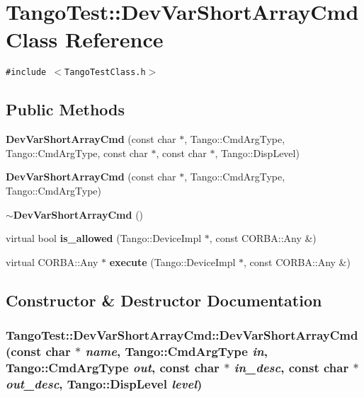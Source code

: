 \section{Tango\-Test::Dev\-Var\-Short\-Array\-Cmd  Class Reference}
\label{classTangoTest_1_1DevVarShortArrayCmd}
{\tt \#include $<$Tango\-Test\-Class.h$>$}

\subsection*{Public Methods}
\begin{CompactItemize}
\item 
{\bf Dev\-Var\-Short\-Array\-Cmd} (const char $\ast$, Tango::Cmd\-Arg\-Type, Tango::Cmd\-Arg\-Type, const char $\ast$, const char $\ast$, Tango::Disp\-Level)
\item 
{\bf Dev\-Var\-Short\-Array\-Cmd} (const char $\ast$, Tango::Cmd\-Arg\-Type, Tango::Cmd\-Arg\-Type)
\item 
{\bf $\sim$Dev\-Var\-Short\-Array\-Cmd} ()
\item 
virtual bool {\bf is\_\-allowed} (Tango::Device\-Impl $\ast$, const CORBA::Any \&)
\item 
virtual CORBA::Any $\ast$ {\bf execute} (Tango::Device\-Impl $\ast$, const CORBA::Any \&)
\end{CompactItemize}


\subsection{Constructor \& Destructor Documentation}
\subsubsection{\setlength{\rightskip}{0pt plus 5cm}Tango\-Test::Dev\-Var\-Short\-Array\-Cmd::Dev\-Var\-Short\-Array\-Cmd (const char $\ast$ {\em name}, Tango::Cmd\-Arg\-Type {\em in}, Tango::Cmd\-Arg\-Type {\em out}, const char $\ast$ {\em in\_\-desc}, const char $\ast$ {\em out\_\-desc}, Tango::Disp\-Level {\em level})}\label{classTangoTest_1_1DevVarShortArrayCmd_a0}



